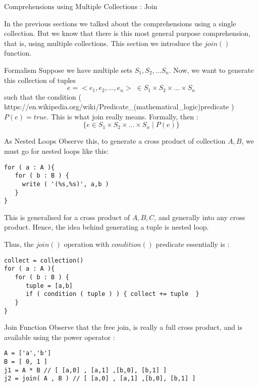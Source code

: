 \begin{section}{Comprehensions using Multiple Collections : Join}

In the previous sections we talked about the comprehensions using a single collection.
But we know that there is this most general purpose comprehension, that is, 
using multiple collections. This section we introduce the $join()$ function.

\begin{subsection}{Formalism}
Suppose we have multiple sets $S_1,S_2,...S_n$.
Now, we want to generate this collection of tuples 
$$
e = <e_1,e_2,...,e_n> \; \in S_1 \times S_2 \times ... \times S_n
$$ 
such that the condition ( {https://en.wikipedia.org/wiki/Predicate\_(mathematical\_logic)}{predicate} ) $P(e) = true $.
This is what join really means. Formally, then :
$$
\{  e \in S_1 \times S_2 \times ... \times S_n \; | \; P(e) \} 
$$

\end{subsection}

\begin{subsection}{As Nested Loops}
Observe this, to generate a cross product of collection $A,B$, we must
go for nested loops like this:

\begin{lstlisting}[style=JexlStyle]
for ( a : A ){
   for ( b : B ) {
     write ( '(%s,%s)', a,b ) 
   }
}
\end{lstlisting}
This is generalised for a cross product of $A,B,C$, and generally into any cross product. 
Hence, the idea behind generating a tuple is nested loop.

Thus, the $join()$ operation with $condition()$ predicate essentially is :

\begin{lstlisting}[style=JexlStyle]
collect = collection()
for ( a : A ){
   for ( b : B ) {
      tuple = [a,b]
      if ( condition ( tuple ) ) { collect += tuple  } 
   }
}
\end{lstlisting}
\end{subsection}

\begin{subsection}{Join Function}
Observe that the free join, is really a full cross product, 
and is available using the power operator :

\begin{lstlisting}[style=JexlStyle]
A = ['a','b']
B = [ 0, 1 ]
j1 = A * B // [ [a,0] , [a,1] ,[b,0], [b,1] ]
j2 = join( A , B ) // [ [a,0] , [a,1] ,[b,0], [b,1] ]
\end{lstlisting}


\end{subsection}
\end{section}

